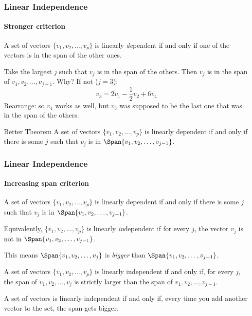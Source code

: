 
\begin{frame}
\frametitle{Linear Independence}
\framesubtitle{Stronger criterion}

\vskip-3mm
\begin{thm}
  A set of vectors $\{v_1,v_2,\ldots,v_p\}$ is linearly \textit{de}pendent if and only if
  one of the vectors is in the span of the other ones.
\end{thm}

\pause\medskip
Take the largest $j$ such that $v_j$ is in the span of the others.
\pause
Then $v_j$ is in the span of $v_1,v_2,\ldots,v_{j-1}$.  Why?
\pause
If not ($j=3$):
\[ v_3 = 2v_1 - \frac 12v_2 + 6v_4 \]
\pause
Rearrange:
\webonlycmd{
\[ v_4 = -\frac 16\biggl( 2v_1 - \frac 12v_2 - v_3 \biggr) \]}%
\pause
so $v_4$ works as well, but $v_3$ was supposed to be the last one that was in
the span of the others.

\pause\medskip

\begin{oneoffthm}[definition]{Better Theorem}
  A set of vectors $\{v_1,v_2,\ldots,v_p\}$ is linearly dependent if and only if
  there is some $j$ such that $v_j$ is in $\Span\{v_1,v_2,\ldots,v_{j-1}\}$.
\end{oneoffthm}


\end{frame}



\begin{frame}
\frametitle{Linear Independence}
\framesubtitle{Increasing span criterion}

\vskip-3mm
\begin{thm}
  A set of vectors $\{v_1,v_2,\ldots,v_p\}$ is linearly dependent if and only if
  there is some $j$ such that $v_j$ is in $\Span\{v_1,v_2,\ldots,v_{j-1}\}$.
\end{thm}

\pause\bigskip
Equivalently, $\{v_1,v_2,\ldots,v_p\}$ is linearly \textit{in}dependent if for every $j$,
the vector $v_j$ is not in $\Span\{v_1,v_2,\ldots,v_{j-1}\}$.

\pause\medskip
This means $\Span\{v_1,v_2,\ldots,v_j\}$ is \emph{bigger} than
$\Span\{v_1,v_2,\ldots,v_{j-1}\}$.

\pause\bigskip
\begin{thm}
  A set of vectors $\{v_1,v_2,\ldots,v_p\}$ is linearly independent if
  and only if, for every $j$, the span of $v_1,v_2,\ldots,v_{j}$ is strictly
  larger than the span of $v_1,v_2,\ldots,v_{j-1}$.
\end{thm}

\pause\medskip
\begin{bluebox}[Translation]{.7\linewidth}
  A set of vectors is linearly independent if and only if, every time you add
  another vector to the set, the span gets bigger.
\end{bluebox}

\end{frame}


